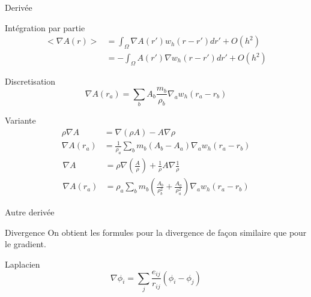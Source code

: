 \begin{frame}{Derivée}
 \begin{block}{Intégration par partie}
 \begin{align*}
  <\nabla A(r)>&=\int_{\Omega} \nabla A(r')w_{h}(r-r')dr'+O(h^2)\\
  &=-\int_{\Omega} A(r')\nabla w_{h}(r-r')dr'+O(h^2)
 \end{align*}
\end{block}
\begin{block}{Discretisation}
\begin{equation*}
 \nabla A(r_a)=\sum_{b}A_b\frac{m_b}{\rho_b}\nabla_a w_{h}(r_a-r_b)
 \end{equation*}
\end{block}
\begin{block}{Variante}
 \begin{align*}
  \rho\nabla A&=\nabla(\rho A)-A\nabla \rho\\
  \nabla A(r_a)&=\frac{1}{\rho_a}\sum_{b}m_b \left(A_b-A_a\right) \nabla_a w_{h}(r_a-r_b)
 \end{align*}
\begin{align*}
 \nabla A&=\rho\nabla(\frac{A}{\rho})+\frac{1}{\rho}A\nabla \frac{1}{\rho}\\
 \nabla A(r_a)&=\rho_a\sum_{b} m_b\left(\frac{A_b}{\rho_b^2}+\frac{A_a}{\rho_a^2}\right) \nabla_a w_{h}(r_a-r_b)
\end{align*}

\end{block}


\end{frame}

\begin{frame}{Autre derivée}
 \begin{block}{Divergence}
  On obtient les formules pour la divergence de façon similaire que pour le gradient.
 \end{block}

 \begin{block}{Laplacien}
 \begin{equation*}
  \nabla \phi_{i}=\sum_{j}\frac{e_{ij}}{r_{ij}}\left(\phi_{i}-\phi_{j}\right)
  \end{equation*}
 \end{block}

\end{frame}

